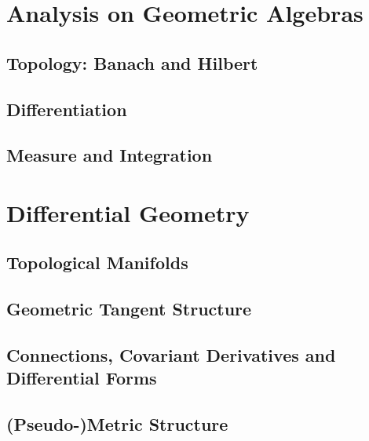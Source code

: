 
\section{Analysis on Geometric Algebras}

\subsection{Topology: Banach and Hilbert}
\lipsum[1-5]
\cite{einstein}

\lipsum[2-5]

\subsection{Differentiation}
\lipsum[3-5]

\subsection{Measure and Integration}
\lipsum[3-5]

\section{Differential Geometry}

\subsection{Topological Manifolds}
\lipsum[1-5]
\lipsum[1-5]

\subsection{Geometric Tangent Structure}
\lipsum[1-5]
\cite{latexcompanion}
\lipsum[1-5]

\subsection{Connections, Covariant Derivatives and Differential Forms}
\lipsum[1-5]
\cite{latexcompanion}
\lipsum[1-5]

\subsection{(Pseudo-)Metric Structure}
\lipsum[2-5]